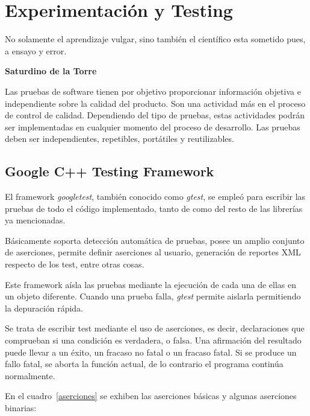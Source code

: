 \chapter{Experimentación y Testing}

\epigraph{No solamente el aprendizaje vulgar, sino
también el científico esta sometido pues, a ensayo
y error.}%
{\textbf{Saturdino de la Torre}}

Las pruebas de software tienen por objetivo proporcionar información objetiva e independiente sobre la calidad del producto. Son una actividad más en el proceso de control de calidad. Dependiendo del tipo de pruebas, estas actividades podrán ser implementadas en cualquier momento del proceso de desarrollo. Las pruebas deben ser independientes, repetibles, portátiles y reutilizables. 

\section{Google C++ Testing Framework}

\par El framework \emph{googletest}, también conocido como \emph{gtest}, se empleó para escribir las pruebas de todo el código implementado, tanto de \remo como del resto de las librerías ya mencionadas. 
\par Básicamente soporta detección automática de pruebas, posee un amplio conjunto de aserciones, permite definir aserciones al usuario, generación de reportes XML respecto de los test, entre otras cosas.

\par Este framework aísla las pruebas mediante la ejecución de cada una de ellas en un objeto diferente. Cuando una prueba falla, \emph{gtest} permite aislarla permitiendo la depuración rápida.

\par Se trata de escribir test mediante el uso de aserciones, es decir, declaraciones que comprueban si una condición es verdadera, o falsa. Una afirmación del resultado puede llevar a un éxito, un fracaso no fatal o un fracaso fatal. Si se produce un fallo fatal, se aborta la función actual, de lo contrario el programa continúa normalmente.

En el cuadro~\ref{aserciones} se exhiben las aserciones básicas y algunas aserciones binarias:


